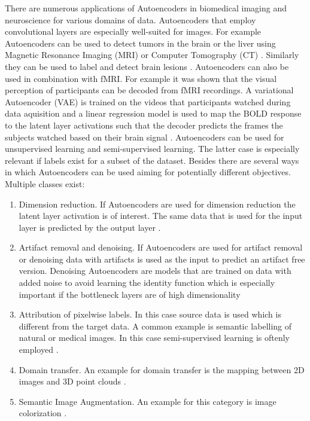  There are numerous applications of Autoencoders in biomedical imaging and neuroscience for various domains of data. Autoencoders that employ convolutional layers are especially well-suited for images. For example Autoencoders can be used to detect tumors in the brain or the liver using Magnetic Resonance Imaging (MRI) or Computer Tomography (CT) \parencite{mallick2019brain, sital20203d}. Similarly they can be used to label and detect brain lesions \parencite{alex2017semisupervised}. Autoencoders can also be used in combination with fMRI. For example it was shown that the visual perception of participants can be decoded from fMRI recordings. A variational Autoencoder (VAE) is trained on the videos that participants watched during data aquisition and a linear regression model is used to map the BOLD response to the latent layer activations such that the decoder predicts the frames the subjects watched based on their brain signal \parencite{han2019variational}. Autoencoders can be used for unsupervised learning and semi-supervised learning. The latter case is especially relevant if labels exist for a subset of the dataset. Besides there are several ways in which Autoencoders can be used aiming for potentially different objectives. Multiple classes exist:\\
\begin{enumerate}[label={(\arabic*)}]
    \item Dimension reduction. If Autoencoders are used for dimension reduction the latent layer activation is of interest. The same data that is used for the input layer is predicted by the output layer \parencite{han2019variational}.
    \item Artifact removal and denoising. If Autoencoders are used for artifact removal or denoising data with artifacts is used as the input to predict an artifact free version. Denoising Autoencoders are models that are trained on data with added noise to avoid learning the identity function which is especially important if the bottleneck layers are of high dimensionality \parencite{paperswithcode2021denoising}
    \item Attribution of pixelwise labels. In this case source data is used which is different from the target data. A common example is semantic labelling of natural or medical images. In this case semi-supervised learning is oftenly employed \parencite{alex2017semisupervised}.
    \item Domain transfer. An example for domain transfer is the mapping between 2D images and 3D point clouds \parencite{lin2018learning}.
    \item Semantic Image Augmentation. An example for this category is image colorization \parencite{anwar2020image}.
\end{enumerate}
